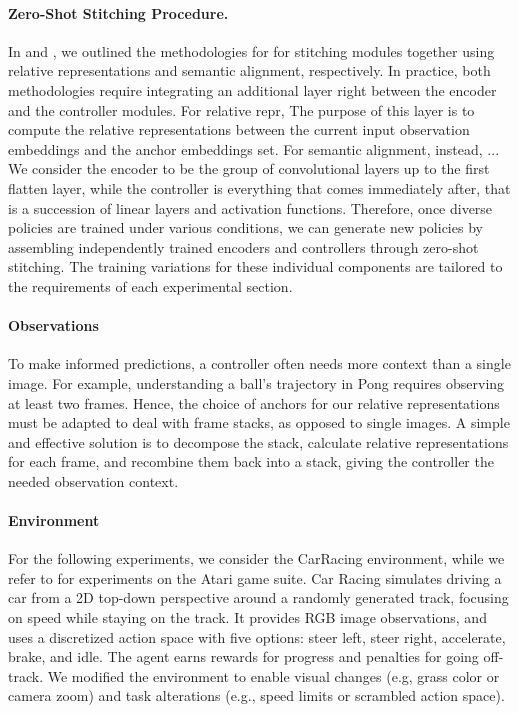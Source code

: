 \paragraph{Zero-Shot Stitching Procedure.}
In  and , we outlined the methodologies for for stitching modules together using relative representations and semantic alignment, respectively. In practice, both methodologies require integrating an additional layer right between the encoder and the controller modules. For relative repr, The purpose of this layer is to compute the relative representations between the current input observation embeddings and the anchor embeddings set.
For semantic alignment, instead, ...
We consider the encoder to be the group of convolutional layers up to the first flatten layer, while the controller is everything that comes immediately after, that is a succession of linear layers and activation functions.  
Therefore, once diverse policies are trained under various conditions, we can generate new policies by assembling independently trained encoders and controllers through zero-shot stitching. The training variations for these individual components are tailored to the requirements of each experimental section.

\paragraph{Observations}
To make informed predictions, a controller often needs more context than a single image. For example, understanding a ball's trajectory in Pong requires observing at least two frames. Hence, the choice of anchors for our relative representations must be adapted to deal with frame stacks, as opposed to single images. A simple and effective solution is to decompose the stack, calculate relative representations for each frame, and recombine them back into a stack, giving the controller the needed observation context. 

\paragraph{Environment}
For the following experiments, we consider the CarRacing \citep{klimov2016carracing} environment, while we refer to  for experiments on the Atari game suite.
Car Racing simulates driving a car from a 2D top-down perspective around a randomly generated track, focusing on speed while staying on the track. It provides RGB image observations, and uses a discretized action space with five options: steer left, steer right, accelerate, brake, and idle. The agent earns rewards for progress and penalties for going off-track. We modified the environment to enable visual changes (e.g, grass color or camera zoom) and task alterations (e.g., speed limits or scrambled action space). 

